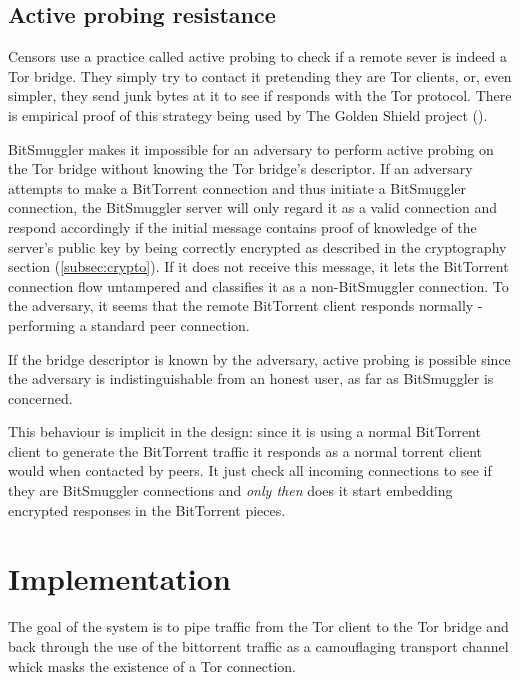 \documentclass[11pt]{book} %
\newcommand{\projectName}{BitSmuggler }
\begin{document}
\section{Active probing resistance}
\label{subsec:activeProbingResist}

Censors use a practice called active probing to check if  a remote sever is indeed a Tor bridge. They simply try to contact it pretending they are Tor clients, or, even simpler, they send junk bytes at it to see if responds with the Tor protocol. There is empirical proof of this strategy being used by The Golden Shield project (\citep*{web:bridgeKnock}).

\projectName makes it impossible for an adversary to perform active probing on the Tor bridge without knowing the Tor bridge's descriptor. If an adversary attempts to make a BitTorrent connection and thus initiate a \projectName connection, the \projectName server will only regard it as a valid connection and respond accordingly if the initial message contains proof of knowledge of the server's public key by being correctly encrypted as described in the cryptography section (\ref{subsec:crypto}).  If it does not receive this message, it lets the BitTorrent connection flow untampered and classifies it as a non-\projectName connection. To the adversary, it seems that the remote BitTorrent client responds normally - performing a standard peer connection. 

If the bridge descriptor is known by the adversary, active probing is possible since the adversary is indistinguishable from an honest user, as far as BitSmuggler is concerned.

This behaviour is implicit in the design: since it is using a normal BitTorrent client to generate the BitTorrent traffic it responds as a normal torrent client would when contacted by peers. It just check all incoming connections to see if they are \projectName connections and \textit{only then} does it start embedding encrypted responses in the BitTorrent pieces.


\chapter{Implementation}
\label{implementation}

The goal of the system is to pipe traffic from the Tor client to the Tor bridge and back through the use of the bittorrent traffic as a camouflaging transport channel whick masks the existence of a Tor connection.
\end{document}
